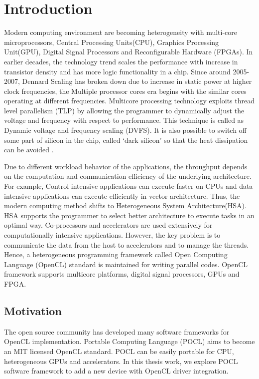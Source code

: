 \chapter{Introduction}
\label{ch1_introduction}

Modern computing environment are becoming heterogeneity with multi-core microprocessors, Central Processing Units(CPU), Graphics Processing Unit(GPU), Digital Signal Processors and Reconfigurable Hardware (FPGAs). In earlier decades, the technology trend scales the performance with increase in transistor density and has more logic functionality in a chip. Since around 2005-2007, Dennard Scaling has broken down due to increase in static power at higher clock frequencies, the Multiple processor cores era begins with the similar cores operating at different frequencies. Multicore processing technology exploits thread level parallelism (TLP) by allowing the programmer to dynamically adjust the voltage and frequency with respect to performance. This technique is called as Dynamic voltage and frequency scaling (DVFS). It is also possible to switch off some part of silicon in the chip, called ‘dark silicon’ so that the heat dissipation can be avoided \cite{1}.

Due to different workload behavior of the applications, the throughput depends on the computation and communication efficiency of the underlying architecture. For example, Control intensive applications can execute faster on CPUs and data intensive applications can execute efficiently in vector architecture. Thus, the modern computing method shifts to Heterogeneous System Architecture(HSA). HSA supports the programmer to select better architecture to execute tasks in an optimal way. Co-processors and accelerators are used extensively for computationally intensive applications. However, the key problem is to communicate the data from the host to accelerators and to manage the threads. Hence, a heterogeneous programming framework called Open Computing Language (OpenCL) standard is maintained for writing parallel codes. OpenCL framework supports multicore platforms, digital signal processors, GPUs and FPGA.

\section{Motivation}
The open source community has developed many software frameworks for OpenCL implementation. Portable Computing Language (POCL) aims to become an MIT licensed OpenCL standard. POCL can be easily portable for CPU, heterogeneous GPUs and accelerators. In this thesis work, we explore POCL software framework to add a new device with OpenCL driver integration.

